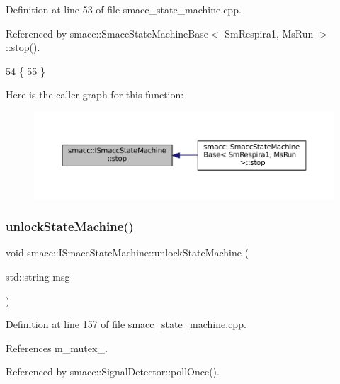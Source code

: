 Definition at line 53 of file smacc\+\_\+state\+\_\+machine.\+cpp.



Referenced by smacc\+::\+Smacc\+State\+Machine\+Base$<$ Sm\+Respira1, Ms\+Run $>$\+::stop().


\begin{DoxyCode}
54 \{
55 \}
\end{DoxyCode}
Here is the caller graph for this function\+:
\nopagebreak
\begin{figure}[H]
\begin{center}
\leavevmode
\includegraphics[width=350pt]{classsmacc_1_1ISmaccStateMachine_adcb1b55e014f982a713a863ffb0261d3_icgraph}
\end{center}
\end{figure}
\mbox{\label{classsmacc_1_1ISmaccStateMachine_ae2e3ceb87bfe3f9d8bf320e36071fdc7}} 
\subsubsection{\texorpdfstring{unlock\+State\+Machine()}{unlockStateMachine()}}
{\footnotesize\ttfamily void smacc\+::\+I\+Smacc\+State\+Machine\+::unlock\+State\+Machine (\begin{DoxyParamCaption}\item[{std\+::string}]{msg }\end{DoxyParamCaption})\hspace{0.3cm}{\ttfamily [private]}}



Definition at line 157 of file smacc\+\_\+state\+\_\+machine.\+cpp.



References m\+\_\+mutex\+\_\+.



Referenced by smacc\+::\+Signal\+Detector\+::poll\+Once().


